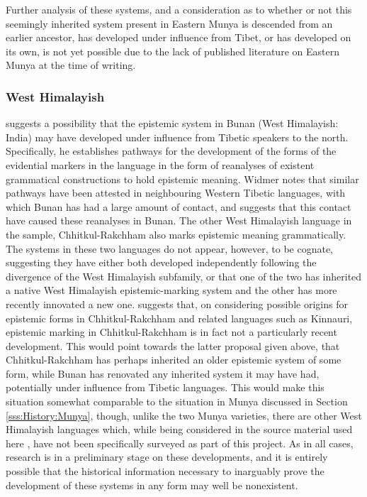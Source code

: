 Further analysis of these systems, and a consideration as to whether or not this seemingly inherited system present in Eastern Munya is descended from an earlier ancestor, has developed under influence from Tibet, or has developed on its own, is not yet possible due to the lack of published literature on Eastern Munya at the time of writing.

\subsubsection{West Himalayish}
 suggests a possibility that the epistemic system in Bunan (West Himalayish: India) may have developed under influence from Tibetic speakers to the north. Specifically, he establishes pathways for the development of the forms of the evidential markers in the language in the form of reanalyses of existent grammatical constructions to hold epistemic meaning. Widmer notes that similar pathways have been attested in neighbouring Western Tibetic languages, with which Bunan has had a large amount of contact, and suggests that this contact have caused these reanalyses in Bunan. The other West Himalayish language in the sample, Chhitkul-Rakchham \cite[West Himalayish: India,][]{Martinez2021} also marks epistemic meaning grammatically. The systems in these two languages do not appear, however, to be cognate, suggesting they have either both developed independently following the divergence of the West Himalayish subfamily, or that one of the two has inherited a native West Himalayish epistemic-marking system and the other has more recently innovated a new one.  suggests that, on considering possible origins for epistemic forms in Chhitkul-Rakchham and related languages such as Kinnauri, epistemic marking in Chhitkul-Rakchham is in fact not a particularly recent development. This would point towards the latter proposal given above, that Chhitkul-Rakchham has perhaps inherited an older epistemic system of some form, while Bunan has renovated any inherited system it may have had, potentially under influence from Tibetic languages. This would make this situation somewhat comparable to the situation in Munya discussed in Section \ref{sss:History:Munya}, though, unlike the two Munya varieties, there are other West Himalayish languages which, while being considered in the source material used here \cites{Widmer2014}{Widmer2017}{Martinez2021}, have not been specifically surveyed as part of this project. As in all cases, research is in a preliminary stage on these developments, and it is entirely possible that the historical information necessary to inarguably prove the development of these systems in any form may well be nonexistent.

